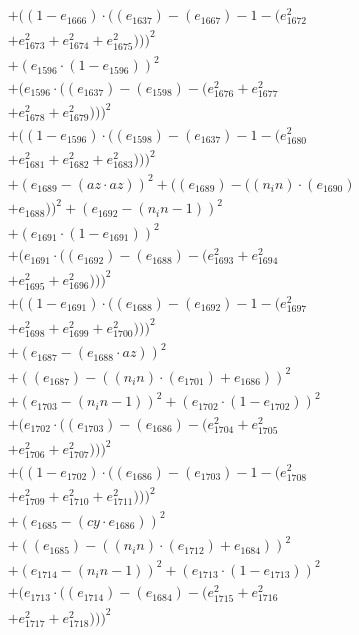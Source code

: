 \documentclass[10pt, a4paper]{article}
\begin{document}
\begin{small}
\begin{align*}
& + ((1 - e_{1666})  \cdot  ((e_{1637}) - (e_{1667}) - 1 - (e_{1672}^{2} \\
& + e_{1673}^{2} + e_{1674}^{2} + e_{1675}^{2})))^{2} \\
& + (e_{1596}  \cdot  (1 - e_{1596}))^{2} \\
& + (e_{1596}  \cdot  ((e_{1637}) - (e_{1598}) - (e_{1676}^{2} + e_{1677}^{2} \\
& + e_{1678}^{2} + e_{1679}^{2})))^{2} \\
& + ((1 - e_{1596})  \cdot  ((e_{1598}) - (e_{1637}) - 1 - (e_{1680}^{2} \\
& + e_{1681}^{2} + e_{1682}^{2} + e_{1683}^{2})))^{2} \\
& + (e_{1689} - (az  \cdot  az))^{2} + ((e_{1689}) - ((n_in)  \cdot  (e_{1690}) \\
& + e_{1688}))^{2} + (e_{1692} - (n_in - 1))^{2} \\
& + (e_{1691}  \cdot  (1 - e_{1691}))^{2} \\
& + (e_{1691}  \cdot  ((e_{1692}) - (e_{1688}) - (e_{1693}^{2} + e_{1694}^{2} \\
& + e_{1695}^{2} + e_{1696}^{2})))^{2} \\
& + ((1 - e_{1691})  \cdot  ((e_{1688}) - (e_{1692}) - 1 - (e_{1697}^{2} \\
& + e_{1698}^{2} + e_{1699}^{2} + e_{1700}^{2})))^{2} \\
& + (e_{1687} - (e_{1688}  \cdot  az))^{2} \\
& + ((e_{1687}) - ((n_in)  \cdot  (e_{1701}) + e_{1686}))^{2} \\
& + (e_{1703} - (n_in - 1))^{2} + (e_{1702}  \cdot  (1 - e_{1702}))^{2} \\
& + (e_{1702}  \cdot  ((e_{1703}) - (e_{1686}) - (e_{1704}^{2} + e_{1705}^{2} \\
& + e_{1706}^{2} + e_{1707}^{2})))^{2} \\
& + ((1 - e_{1702})  \cdot  ((e_{1686}) - (e_{1703}) - 1 - (e_{1708}^{2} \\
& + e_{1709}^{2} + e_{1710}^{2} + e_{1711}^{2})))^{2} \\
& + (e_{1685} - (cy  \cdot  e_{1686}))^{2} \\
& + ((e_{1685}) - ((n_in)  \cdot  (e_{1712}) + e_{1684}))^{2} \\
& + (e_{1714} - (n_in - 1))^{2} + (e_{1713}  \cdot  (1 - e_{1713}))^{2} \\
& + (e_{1713}  \cdot  ((e_{1714}) - (e_{1684}) - (e_{1715}^{2} + e_{1716}^{2} \\
& + e_{1717}^{2} + e_{1718}^{2})))^{2} \\

\end{align*}
\end{small}
\end{document}
